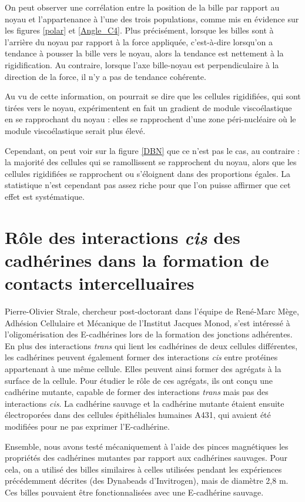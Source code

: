 On peut observer une corrélation entre la position de la bille par rapport au noyau et l'appartenance à l'une des trois populations, comme mis en évidence sur les figures \ref{polar} et \ref{Angle_C4}. 
Plus précisément, lorsque les billes sont \og à l'arrière du noyau \fg par rapport à la force appliquée, c'est-à-dire lorsqu'on a tendance à pousser la bille vers le noyau, alors la tendance est nettement à la rigidification. Au contraire, lorsque l'axe bille-noyau est perpendiculaire à la direction de la force, il n'y a pas de tendance cohérente. 

Au vu de cette information, on pourrait se dire que les cellules rigidifiées, qui sont tirées vers le noyau, expérimentent en fait un gradient de module viscoélastique en se rapprochant du noyau : elles se rapprochent d'une zone péri-nucléaire où le module viscoélastique serait plus élevé. 

Cependant, on peut voir sur la figure \ref{DBN} que ce n'est pas le cas, au contraire : la majorité des cellules qui se ramollissent se rapprochent du noyau, alors que les cellules rigidifiées se rapprochent ou s'éloignent dans des proportions égales. La statistique n'est cependant pas assez riche pour que l'on puisse affirmer que cet effet est systématique.

 
 \section{Rôle des interactions \textit{cis} des cadhérines dans la formation de contacts intercelluaires}
 
 Pierre-Olivier Strale, chercheur post-doctorant dans l'équipe de René-Marc Mège, Adhésion Cellulaire et Mécanique de l'Institut Jacques Monod, s'est intéressé à l'oligomérisation des E-cadhérines lors de la formation des jonctions adhérentes. En plus des interactions \textit{trans} qui lient les cadhérines de deux cellules différentes, les cadhérines peuvent également former des interactions \textit{cis} entre protéines appartenant à une même cellule. Elles peuvent ainsi former des agrégats à la surface de la cellule. Pour étudier le rôle de ces agrégats, ils ont conçu une cadhérine mutante, capable de former des interactions \textit{trans} mais pas des interactions \textit{cis}. La cadhérine sauvage et la cadhérine mutante étaient ensuite électroporées dans des cellules épithéliales humaines A431, qui avaient été modifiées pour ne pas exprimer l'E-cadhérine.  
 
 Ensemble, nous avons testé mécaniquement à l'aide des pinces magnétiques les propriétés des cadhérines mutantes par rapport aux cadhérines sauvages. Pour cela, on a utilisé des billes similaires à celles utilisées pendant les expériences précédemment décrites (des Dynabeads d'Invitrogen), mais de diamètre 2,8 \micro m. Ces billes pouvaient être fonctionnalisées avec une E-cadhérine sauvage. 
 
